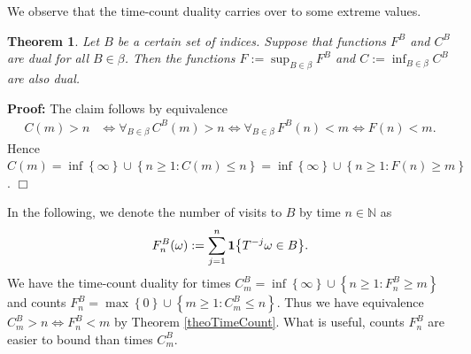 \documentclass[a4paper,12pt]{article}
\newcommand{\klam}[1]{\left\{ #1 \right\}}
\newcommand{\boole}[1]{{\bf 1}{\klam{#1}}}
\newtheorem{theorem}{Theorem}
\newenvironment*{proof}{\begin{trivlist}\item[]
\noindent\textbf{Proof:}}{$\Box$\par\end{trivlist}}
\begin{document}
We observe that the time-count duality carries over to some extreme
values.
\begin{theorem}
  \label{theoExtreme}
  Let $B$ be a certain set of indices.  Suppose that functions
  $F^B$ and $C^B$ are dual for all $B\in\beta$. Then the functions
  $F:=\sup_{B\in\beta} F^B$ and $C:=\inf_{B\in\beta} C^B$ are also
  dual.
\end{theorem}
\begin{proof}
  The claim follows by equivalence
  \begin{align}
    C(m)>n
    &\iff\forall_{B\in\beta}\,C^B(m)>n
    \iff
      \forall_{B\in\beta}\,F^B(n)<m
      \iff F(n)<m.
  \end{align}
  Hence 
    $C(m)=\inf\klam{\infty}\cup\klam{n\ge 1: C(m)\le n}
    =\inf\klam{\infty}\cup\klam{n\ge 1: F(n)\ge m}$.
\end{proof}

In the following, we denote
the number of visits to $B$ by time $n\in\mathbb{N}$ as
\begin{align}
  F^B_n(\omega):=\sum_{j=1}^n \boole{T^{-j}\omega\in B}.
\end{align}
We have the time-count duality for times
$C^B_m=\inf\klam{\infty}\cup\klam{n\ge 1: F^B_n\ge m}$ and counts
$F^B_n=\max\klam{0}\cup\klam{m\ge 1: C^B_m\le n}$.  Thus we have
equivalence $C^B_m>n\iff F^B_n<m$ by Theorem \ref{theoTimeCount}.
What is useful, counts $F^B_n$ are easier to bound than times $C^B_m$.
\end{document}
